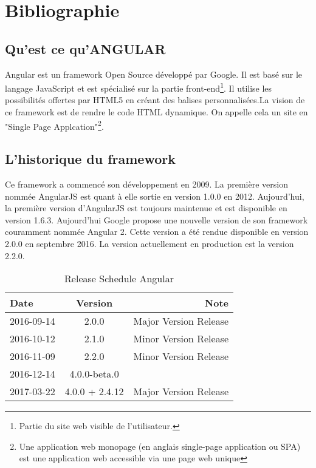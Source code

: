 \chapter{Bibliographie}



\section{Qu'est ce qu'ANGULAR}
Angular est un framework Open Source développé par Google. Il est basé sur le langage JavaScript et est spécialisé sur la partie front-end\footnote{Partie du site web visible de l'utilisateur.}. Il utilise les possibilités offertes par HTML5 en créant des balises personnalisées.La vision de ce framework est de rendre le code HTML dynamique. On appelle cela un site en "Single Page Applcation"\footnote{Une application web monopage (en anglais single-page application ou SPA) est une application web accessible via une page web unique\cite{wiki:Single-page_application}}.

\section{L'historique du framework}

Ce framework a commencé son développement en 2009. La première version nommée AngularJS est quant à elle sortie en version 1.0.0 en 2012. Aujourd'hui, la  première version d'AngularJS est toujours maintenue et est disponible en version 1.6.3. Aujourd'hui Google propose une nouvelle version de son framework couramment nommée Angular 2. Cette version a été rendue disponible en version 2.0.0 en septembre 2016. La version actuellement en production est la version 2.2.0\cite{github:angular2}.

\begin{table}[h]
	\centering
	\begin{tabular}{|l|c|r|}
  		\hline
  			Date & Version & Note \\
  		\hline
		  2016-09-14 & 2.0.0 & Major Version Release \\
		  2016-10-12 & 2.1.0 & Minor Version Release \\
		  2016-11-09 & 2.2.0 & Minor Version Release \\
		  2016-12-14 & 4.0.0-beta.0 & \\
		  2017-03-22 & 4.0.0 + 2.4.12 & Major Version Release \\
  		\hline
\end{tabular}
	\caption{Release Schedule Angular}
\end{table}

